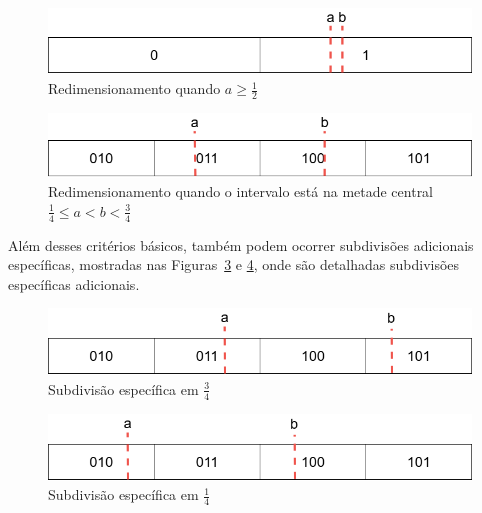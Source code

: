\begin{figure}[ht]
	\centering
	\caption{Redimensionamento quando \( a \geq \frac{1}{2} \)}
	\label{fig:DiagramasTCC-Diagramas-Aritmetic-Rescaling-1}
	\includegraphics[width=12cm]{figuras/DiagramasTCC-Diagramas-Aritmetic-Rescaling-1}
\end{figure}

\begin{figure}[ht]
	\centering
	\caption{Redimensionamento quando o intervalo está na metade central \( \frac{1}{4} \leq a < b < \frac{3}{4} \)}
	\label{fig:DiagramasTCC-Diagramas-Aritmetic-Rescaling-S}
	\includegraphics[width=12cm]{figuras/DiagramasTCC-Diagramas-Aritmetic-Rescaling-S}
\end{figure}

Além desses critérios básicos, também podem ocorrer subdivisões adicionais específicas, mostradas nas Figuras~\ref{fig:DiagramasTCC-Diagramas-Aritmetic-Rescaling-3Q} e \ref{fig:DiagramasTCC-Diagramas-Aritmetic-Rescaling-Q}, onde são detalhadas subdivisões específicas adicionais.

\begin{figure}[ht]
	\centering
	\caption{Subdivisão específica em \( \frac{3}{4} \)}
	\label{fig:DiagramasTCC-Diagramas-Aritmetic-Rescaling-3Q}
	\includegraphics[width=12cm]{figuras/DiagramasTCC-Diagramas-Aritmetic-Rescaling-3Q}
\end{figure}

\begin{figure}[ht]
	\centering
	\caption{Subdivisão específica em \( \frac{1}{4} \)}
	\label{fig:DiagramasTCC-Diagramas-Aritmetic-Rescaling-Q}
	\includegraphics[width=12cm]{figuras/DiagramasTCC-Diagramas-Aritmetic-Rescaling-Q}
\end{figure}



